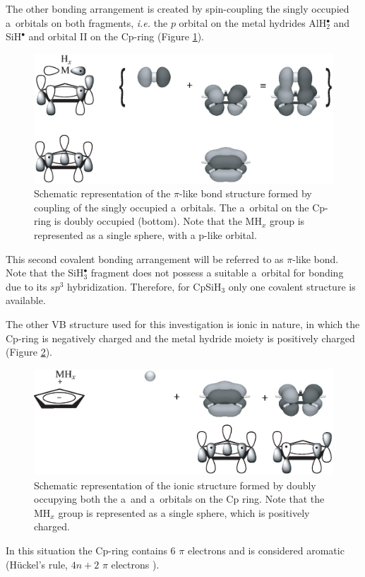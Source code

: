 The other bonding arrangement is created by spin-coupling the singly occupied a\textquotesingle\textquotesingle\ orbitals on both fragments, \textit{i.e.} the $p$ orbital on the metal hydrides AlH$_{2}^\bullet$ and SiH$^\bullet$ and orbital II on the Cp-ring (Figure \ref{ch4.fig.pi}).
\begin{figure}[htbp]
\center
\includegraphics[scale=0.45]{cyclopentadienyl/figures/pi.eps}
\caption{Schematic representation of the $\pi$-like bond structure formed by coupling of the singly occupied a\textquotesingle\textquotesingle\ orbitals. The a\textquotesingle\ orbital on the Cp-ring is doubly occupied (bottom). Note that the MH$_x$ group is represented as a single sphere, with a p-like orbital.}
\label{ch4.fig.pi}
\end{figure}
This second covalent bonding arrangement will be referred to as $\pi$-like bond. Note that the SiH$_{3}^\bullet$ fragment does not possess a suitable a\textquotesingle\textquotesingle\ orbital for bonding due to its $sp^3$ hybridization. Therefore, for CpSiH$_3$ only one covalent structure is available.

The other VB structure used for this investigation is ionic in nature, in which the Cp-ring is negatively charged and the metal hydride moiety is positively charged (Figure \ref{ch4.fig.ionic}).
\begin{figure}[htbp]
\center
\includegraphics[scale=0.45]{cyclopentadienyl/figures/ionic.eps}
\caption{Schematic representation of the ionic structure formed by doubly occupying both the a\textquotesingle\ and a\textquotesingle\textquotesingle\ orbitals on the Cp ring. Note that the MH$_x$ group is represented as a single sphere, which is positively charged.}
\label{ch4.fig.ionic}
\end{figure}
In this situation the Cp-ring contains 6 $\pi$ electrons and is considered aromatic (H\"{u}ckel's rule, $4n+2$ $\pi$ electrons \cite{streitwieser}).

